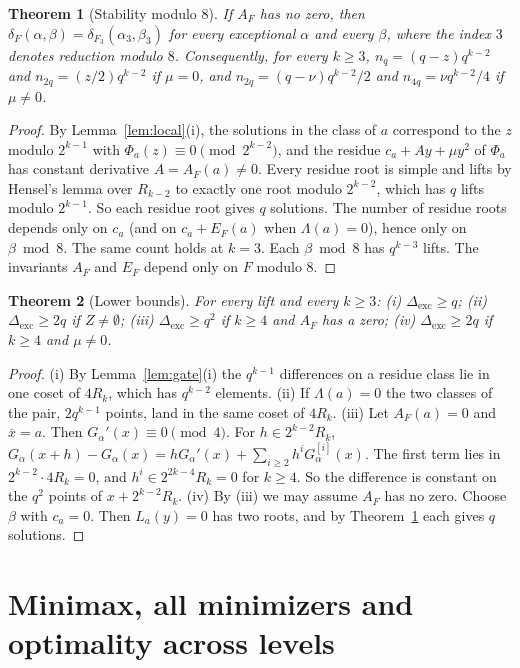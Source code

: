 \documentclass[11pt]{article}
\newtheorem{theorem}{Theorem}[section]
\theoremstyle{definition}
\theoremstyle{remark}
\newcommand{\ol}[1]{\overline{#1}}
\newcommand{\Dexc}{\Delta_{\mathrm{exc}}}
\begin{document}
\begin{theorem}[Stability modulo $8$]\label{thm:S3}
If $A_F$ has no zero, then $\delta_F(\alpha,\beta)=\delta_{F_3}(\alpha_3,\beta_3)$ for every exceptional
$\alpha$ and every $\beta$, where the index $3$ denotes reduction modulo $8$. Consequently, for every
$k\ge3$, $n_q=(q-z)q^{k-2}$ and $n_{2q}=(z/2)q^{k-2}$ if $\mu=0$, and $n_{2q}=(q-\nu)q^{k-2}/2$ and
$n_{4q}=\nu q^{k-2}/4$ if $\mu\ne0$.
\end{theorem}
\begin{proof}
By Lemma~\ref{lem:local}(i), the solutions in the class of $a$ correspond to the $z$ modulo $2^{k-1}$ with
$\Phi_a(z)\equiv0\pmod{2^{k-2}}$, and the residue $c_a+A y+\mu y^2$ of $\Phi_a$ has constant derivative
$A=A_F(a)\ne0$. Every residue root is simple and lifts by Hensel's lemma over $R_{k-2}$ to exactly one root
modulo $2^{k-2}$, which has $q$ lifts modulo $2^{k-1}$. So each residue root gives $q$ solutions. The number of residue
roots depends only on $c_a$ (and on $c_a+E_F(a)$ when $\Lambda(a)=0$), hence only on $\beta\bmod8$. The same
count holds at $k=3$. Each $\beta\bmod 8$ has $q^{k-3}$ lifts. The invariants $A_F$ and $E_F$ depend only on $F$
modulo $8$.
\end{proof}

\begin{theorem}[Lower bounds]\label{thm:M1}
For every lift and every $k\ge3$:
(i) $\Dexc\ge q$; (ii) $\Dexc\ge2q$ if $Z\ne\emptyset$; (iii) $\Dexc\ge q^2$ if $k\ge4$ and $A_F$ has a zero;
(iv) $\Dexc\ge2q$ if $k\ge4$ and $\mu\ne0$.
\end{theorem}
\begin{proof}
(i) By Lemma~\ref{lem:gate}(i) the $q^{k-1}$ differences on a residue class lie in one coset of $4R_k$, which
has $q^{k-2}$ elements. (ii) If $\Lambda(a)=0$ the two classes of the pair, $2q^{k-1}$ points, land in the same
coset of $4R_k$. (iii) Let $A_F(a)=0$ and $\ol x=a$. Then $G_\alpha'(x)\equiv0\pmod4$. For $h\in2^{k-2}R_k$,
$G_\alpha(x+h)-G_\alpha(x)=hG_\alpha'(x)+\sum_{i\ge2}h^iG_\alpha^{[i]}(x)$. The first term lies in
$2^{k-2}\cdot4R_k=0$, and $h^i\in2^{2k-4}R_k=0$ for $k\ge4$. So the difference is constant on the $q^2$ points
of $x+2^{k-2}R_k$. (iv) By (iii) we may assume $A_F$ has no zero. Choose $\beta$ with $c_a=0$. Then
$L_a(y)=0$ has two roots, and by Theorem~\ref{thm:S3} each gives $q$ solutions.
\end{proof}

\section{Minimax, all minimizers and optimality across levels}\label{sec:minimax}
\end{document}
